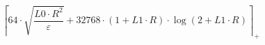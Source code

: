 \[\left\lceil 64 \cdot \sqrt{\frac{L0 \cdot R^{2}}{\varepsilon}} + 32768 \cdot \left(1 + L1 \cdot R\right) \cdot \log\left(2 + L1 \cdot R\right) \right\rceil_{+}\]
